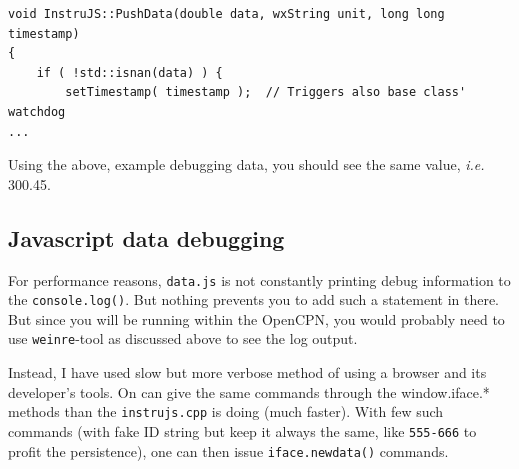 \documentclass[11pt]{article}
\begin{document}
    \begin{verbatim}
void InstruJS::PushData(double data, wxString unit, long long timestamp)
{
    if ( !std::isnan(data) ) {
        setTimestamp( timestamp );  // Triggers also base class' watchdog
...        
\end{verbatim}

    Using the above, example debugging data, you should see the same value,
\emph{i.e.} 300.45.

    \hypertarget{javascript-data-debugging}{%
\subsection{Javascript data debugging}\label{javascript-data-debugging}}

    For performance reasons, \texttt{data.js} is not constantly printing
debug information to the \texttt{console.log()}. But nothing prevents
you to add such a statement in there. But since you will be running
within the OpenCPN, you would probably need to use \texttt{weinre}-tool
as discussed above to see the log output.

    Instead, I have used slow but more verbose method of using a browser and
its developer's tools. On can give the same commands through the
window.iface.* methods than the \texttt{instrujs.cpp} is doing (much
faster). With few such commands (with fake ID string but keep it always
the same, like \texttt{555-666} to profit the persistence), one can then
issue \texttt{iface.newdata()} commands.


    
    
    
\end{document}
